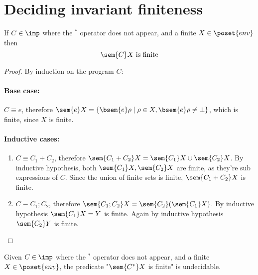 \section{Deciding invariant finiteness}

\begin{lemma}\label{le:finiteness}
  If \(C\in\imp\) where the \(^*\) operator does not appear, and a
  finite \(X \in \poset{env}\) then \[\sem{C}X \text{ is finite}\]
\end{lemma}

\begin{proof}
  By induction on the program \(C\):
  \paragraph*{Base case:\\}
  \(C \equiv e\), therefore \(\sem{e}X = \{\bsem{e}\rho \mid \rho \in
  X , \bsem{e}\rho \neq \bot\}\), which is finite, since \(X\) is
  finite.
  
  \paragraph*{Inductive cases:\\}
  \begin{enumerate}
  \item \(C\equiv C_1 + C_2\), therefore \(\sem{C_1 + C_2} X =
    \sem{C_1}X \cup \sem{C_2}X\). By inductive hypothesis, both
    \(\sem{C_1}X, \sem{C_2}X\) are finite, as they're sub expressions
    of \(C\). Since the union of finite sets is finite, \(\sem{C_1 +
      C_2}X\) is finite.
  \item \(C\equiv C_1; C_2\), therefore \(\sem{C_1;C_2}X =
    \sem{C_2}(\sem{C_1}X)\). By inductive hypothesis \(\sem{C_1}X =
    Y\) is finite. Again by inductive hypothesis \(\sem{C_2}Y\) is
    finite.
  \end{enumerate}
\end{proof}

\begin{lemma}\label{le:infiniteness}
  Given \(C\in\imp\) where the \(^*\) operator does not appear, and a
  finite \(X \in \poset{env}\), the predicate "\(\sem{C^*}X\) is
  finite" is undecidable.
\end{lemma}

